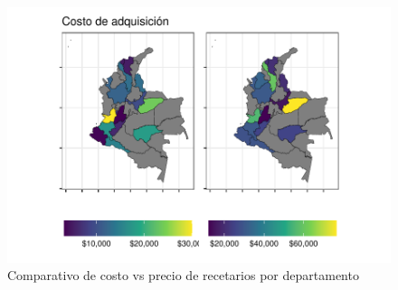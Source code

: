 \documentclass[
]{book}
\begin{document}
\begin{figure}
\includegraphics[width=0.9\linewidth]{InformeFinal_files/figure-latex/costoRecetario-1} \caption{Comparativo de costo vs precio de recetarios por departamento}\label{fig:costoRecetario}
\end{figure}
\end{document}
